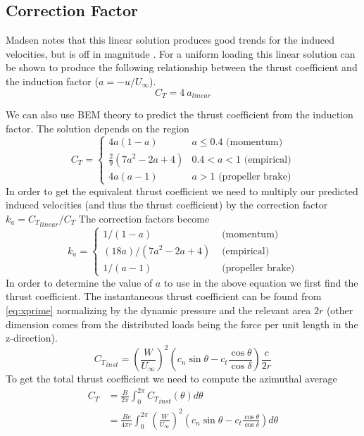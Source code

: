 \documentclass{article}
\begin{document}
\subsection{Correction Factor}
Madsen notes that this linear solution produces good trends for the induced velocities, but is off in magnitude \cite{Madsen2013}.  For a uniform loading this linear solution can be shown to produce the following relationship between the thrust coefficient and the induction factor ($a = -u/U_\infty$).
\begin{equation}
  C_T = 4\ a_{linear}
\end{equation}

We can also use BEM theory to predict the thrust coefficient from the induction factor.  The solution depends on the region
\begin{equation}
C_T =
\begin{cases}
4 a (1-a)  & a \leq 0.4 \textrm{ (momentum)}\\
\frac{2}{9} (7a^2 - 2a + 4)  & 0.4 < a < 1 \textrm{ (empirical)}\\
4 a (a-1)  & a > 1 \textrm{ (propeller brake)}
\end{cases}
\label{eq:CT}
\end{equation}
In order to get the equivalent thrust coefficient we need to multiply our predicted induced velocities (and thus the thrust coefficient) by the correction factor $k_a = {C_T}_{linear} / C_T$
The correction factors become
\begin{equation}
k_a =
\begin{cases}
1/(1-a)  &  \textrm{ (momentum)}\\
(18 a)/(7a^2 - 2a + 4)  & \textrm{ (empirical)}\\
1/(a-1)  & \textrm{ (propeller brake)}
\label{eq:ka}
\end{cases}
\end{equation}
In order to determine the value of $a$ to use in the above equation we first find the thrust coefficient.  The instantaneous thrust coefficient can be found from \eqref{eq:xprime} normalizing by the dynamic pressure and the relevant area $2r$ (other dimension comes from the distributed loads being the force per unit length in the z-direction).
\begin{equation}
{C_T}_{inst} =  \left(\frac{W}{U_\infty}\right)^2  (c_n \sin\theta - c_t \frac{\cos \theta}{\cos\delta}) \frac{c}{2r}
\end{equation}
To get the total thrust coefficient we need to compute the azimuthal average
\begin{equation}
\begin{aligned}
  C_T &= \frac{B}{2\pi}\int_0^{2\pi} {C_T}_{inst}(\theta) d\theta \\
  &= \frac{Bc}{4\pi r}\int_0^{2\pi} \left(\frac{W}{U_\infty}\right)^2  (c_n \sin\theta - c_t \frac{\cos \theta}{\cos\delta}) d\theta
\end{aligned}
\end{equation}
\end{document}

